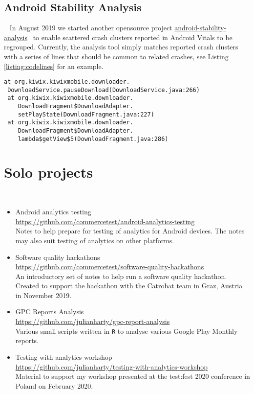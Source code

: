 \subsection{Android Stability Analysis}~\label{subsec:android-stability-analysis}
In August 2019 we started another opensource project \href{https://github.com/commercetest/android-stability-analysis}{android-stability-analysis}~\citep{android-stability-analysis} to enable scattered crash clusters reported in Android Vitals to be regrouped. Currently, the analysis tool simply matches reported crash clusters with a series of lines that should be common to related crashes, see Listing \ref{listing:codelines}  for an example.

\begin{lstlisting}[caption=Example of lines to match,label=listing:codelines]
at org.kiwix.kiwixmobile.downloader.
 DownloadService.pauseDownload(DownloadService.java:266)
 at org.kiwix.kiwixmobile.downloader.
    DownloadFragment$DownloadAdapter.
    setPlayState(DownloadFragment.java:227)
 at org.kiwix.kiwixmobile.downloader.
    DownloadFragment$DownloadAdapter.
    lambda$getView$5(DownloadFragment.java:286)
\end{lstlisting}


\section{Solo projects}~\label{sec:solo-projects}
\begin{itemize}
    \item Android analytics testing\\ \url{https://github.com/commercetest/android-analytics-testing}\\ Notes to help prepare for testing of analytics for Android devices. The notes may also suit testing of analytics on other platforms.

    \item Software quality hackathons\\ \url{https://github.com/commercetest/software-quality-hackathons}\\ An introductory set of notes to help run a software quality hackathon. Created to support the hackathon with the Catrobat team in Graz, Austria in November 2019. 
    \item GPC Reports Analysis\\ \url{https://github.com/julianharty/gpc-report-analysis}\\ Various small scripts written in \texttt{R} to analyse various Google Play Monthly reports.
    
    \item Testing with analytics workshop\\ \url{https://github.com/julianharty/testing-with-analytics-workshop}\\ Material to support my workshop presented at the test:fest 2020 conference in Poland on  February 2020.
\end{itemize}

